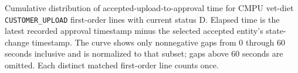 Cumulative distribution of accepted-upload-to-approval time
for CMPU vet-diet \texttt{CUSTOMER\_UPLOAD} first-order lines with current
status D. Elapsed time is the latest recorded approval timestamp minus the
selected accepted entity's state-change timestamp. The curve shows only
nonnegative gaps from 0 through 60 seconds inclusive and is normalized to that
subset; gaps above 60 seconds are omitted. Each distinct matched first-order
line counts once.

